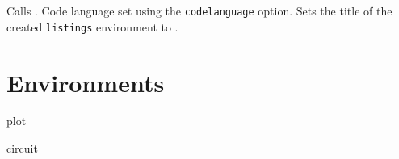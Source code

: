 \documentclass{l3doc}
\begin{document}
\begin{function}{}
  \begin{syntax}
  \end{syntax}
  Calls . Code language set using the \texttt{codelanguage} option. Sets the title of the created \texttt{listings} environment to .
\end{function}

\begin{function}{\listofplots}
\end{function}

\begin{function}{\listofcircuits}
\end{function}


\section{Environments}
\begin{function}{plot}
  \begin{syntax}
  \end{syntax}
\end{function}

\begin{function}{circuit}
  \begin{syntax}
  \end{syntax}
\end{function}
\end{document}
